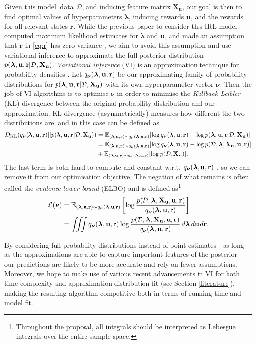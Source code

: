 \documentclass{mprop}
\theoremstyle{definition}
\begin{document}
Given this model, data $\mathcal{D}$, and inducing feature matrix
$\mathbf{X_u}$, our goal is then to find optimal values of hyperparameters
$\bm\lambda$, inducing rewards $\mathbf{u}$, and the rewards for all relevant
states $\mathbf{r}$. While the previous paper to consider this IRL model
computed maximum likelihood estimates for $\bm\lambda$ and $\mathbf{u}$, and
made an assumption that $\mathbf{r}$ in \eqref{eq:r} has zero variance
\cite{DBLP:conf/nips/LevinePK11}, we aim to avoid this assumption and use
variational inference to approximate the full posterior distribution
$p(\bm\lambda, \mathbf{u}, \mathbf{r} | \mathcal{D}, \mathbf{X_u})$. \emph{Variational inference} (VI) is an approximation technique
for probability densities \cite{blei2017variational}. Let $q_{\bm\nu}(\bm\lambda, \mathbf{u}, \mathbf{r})$ be
our approximating family of probability distributions for $p(\bm\lambda, \mathbf{u}, \mathbf{r} | \mathcal{D}, \mathbf{X_u})$ with its
own hyperparameter vector $\bm\nu$. Then the job of VI algorithms is to optimise
$\bm\nu$ in order to minimise the \emph{Kullback-Leibler} (KL) divergence
between the original probability distribution and our approximation.  KL
divergence (asymmetrically) measures how different the two distributions are,
and in this case can be defined as \cite{blei2017variational}
\[ \begin{split}
    D_{\mathrm{KL}}(q_{\bm\nu}(\bm\lambda, \mathbf{u}, \mathbf{r}) || p(\bm\lambda, \mathbf{u}, \mathbf{r} | \mathcal{D}, \mathbf{X_u})) &= \mathbb{E}_{(\bm\lambda, \mathbf{u}, \mathbf{r}) \sim q_{\bm\nu}(\bm\lambda, \mathbf{u}, \mathbf{r})} [\log q_{\bm\nu}(\bm\lambda, \mathbf{u}, \mathbf{r}) -
    \log p(\bm\lambda, \mathbf{u}, \mathbf{r} | \mathcal{D}, \mathbf{X_u}) ] \\
    &= \mathbb{E}_{(\bm\lambda, \mathbf{u}, \mathbf{r}) \sim q_{\bm\nu}(\bm\lambda, \mathbf{u}, \mathbf{r})}[\log q_{\bm\nu}(\bm\lambda, \mathbf{u}, \mathbf{r}) - \log p(\mathcal{D}, \bm\lambda, \mathbf{X_u}, \mathbf{u}, \mathbf{r})] \\
    &+ \mathbb{E}_{(\bm\lambda, \mathbf{u}, \mathbf{r}) \sim q_{\bm\nu}(\bm\lambda, \mathbf{u}, \mathbf{r})}[\log p(\mathcal{D}, \mathbf{X_u})].
  \end{split}
\]
The last term is both hard to compute and constant w.r.t. $q_{\bm\nu}(\bm\lambda, \mathbf{u}, \mathbf{r})$
\cite{blei2017variational}, so we can remove it from our optimisation objective.
The negation of what remains is often called the \emph{evidence lower bound}
(ELBO) and is defined as\footnote{Throughout the proposal, all integrals should
  be interpreted as Lebesgue integrals over the entire sample space.}
\cite{DBLP:books/lib/Bishop07,blei2017variational}
\begin{equation} \label{eq:elbo}
  \begin{split}
    \mathcal{L}(\bm\nu) &= \mathbb{E}_{(\bm\lambda, \mathbf{u}, \mathbf{r}) \sim q_{\bm\nu}(\bm\lambda, \mathbf{u}, \mathbf{r})} \left[ \log \frac{p(\mathcal{D}, \bm\lambda, \mathbf{X_u}, \mathbf{u}, \mathbf{r})}{q_{\bm\nu}(\bm\lambda, \mathbf{u}, \mathbf{r})}
    \right] \\
    &= \iiint q_{\bm\nu}(\bm\lambda, \mathbf{u}, \mathbf{r}) \log
    \frac{p(\mathcal{D}, \bm\lambda, \mathbf{X_u}, \mathbf{u}, \mathbf{r})}{q_{\bm\nu}(\bm\lambda, \mathbf{u}, \mathbf{r})}\,d\bm\lambda\,d\mathbf{u}\,d\mathbf{r}.
  \end{split}
\end{equation}

By considering full probability distributions instead of point estimates---as
long as the approximations are able to capture important features of the
posterior---our predictions are likely to be more accurate and rely on fewer
assumptions. Moreover, we hope to make use of various recent advancements in VI
for both time complexity and approximation distribution fit (see Section
\ref{literature}), making the resulting algorithm competitive both in terms of
running time and model fit.
\end{document}
